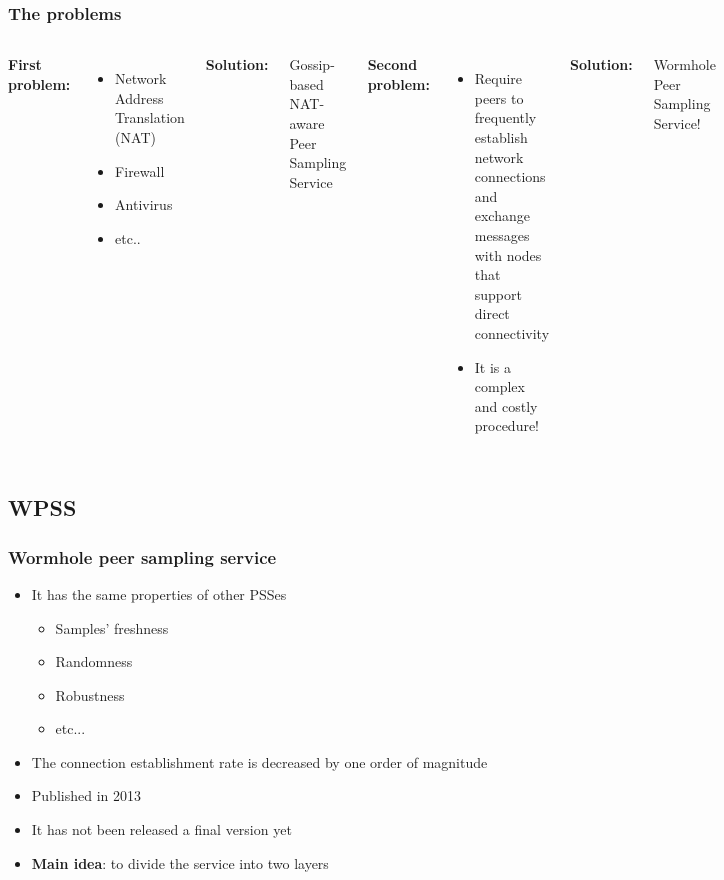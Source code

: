 \documentclass{beamer}
\begin{document}
\begin{frame}
\frametitle{The problems}
\begin{columns}[t] %

\textbf{First problem:}

\begin{itemize}
	\item Network Address Translation (NAT)
	\item Firewall
	\item Antivirus
	\item etc..
\end{itemize}

\pause
\textbf{Solution:}

Gossip-based NAT-aware Peer Sampling Service~\cite{gozar}~\cite{croupier}


\textbf{Second problem:}
\begin{itemize}
	\item Require peers to frequently establish network connections and exchange messages with nodes that support direct connectivity
	\item It is a complex and costly procedure!
\end{itemize}
\pause
\textbf{Solution:}

Wormhole Peer Sampling Service!~\cite{wormhole}

\end{columns}
\end{frame}

\subsection{WPSS}
\frametitle{Wormhole peer sampling service}

\begin{frame}
\begin{itemize}
  \item It has the same properties of other PSSes 
  \begin{itemize}
    \item Samples' freshness
    \item Randomness
    \item Robustness
    \item etc...
  \end{itemize}
  \item The connection establishment rate is decreased by one order of magnitude
	\item Published in 2013
  \item It has not been released a final version yet
	\pause
	\item \textbf{Main idea}: to divide the service into two layers
\end{itemize}
\end{frame}
\end{document}

